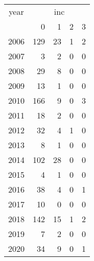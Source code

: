 \footnotesize\begin{tabular}[t]{lrrrr}
\toprule
\multicolumn{1}{c}{year} & \multicolumn{4}{c}{inc} \\
\cmidrule(l{3pt}r{3pt}){1-1} \cmidrule(l{3pt}r{3pt}){2-5}
  & 0 & 1 & 2 & 3\\
\midrule
2006 & 129 & 23 & 1 & 2\\
2007 & 3 & 2 & 0 & 0\\
2008 & 29 & 8 & 0 & 0\\
2009 & 13 & 1 & 0 & 0\\
2010 & 166 & 9 & 0 & 3\\
2011 & 18 & 2 & 0 & 0\\
2012 & 32 & 4 & 1 & 0\\
2013 & 8 & 1 & 0 & 0\\
2014 & 102 & 28 & 0 & 0\\
2015 & 4 & 1 & 0 & 0\\
2016 & 38 & 4 & 0 & 1\\
2017 & 10 & 0 & 0 & 0\\
2018 & 142 & 15 & 1 & 2\\
2019 & 7 & 2 & 0 & 0\\
2020 & 34 & 9 & 0 & 1\\
\bottomrule
\end{tabular}
